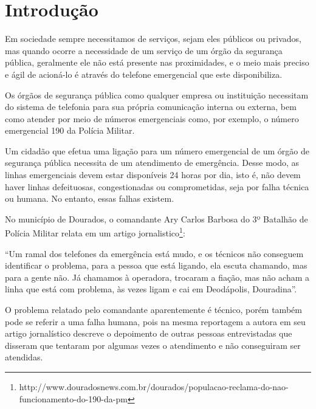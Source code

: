 
\chapter{Introdução}%
Em sociedade sempre necessitamos de serviços, sejam eles públicos ou privados, mas quando ocorre a necessidade de um serviço de um órgão da segurança pública, geralmente ele não está presente nas proximidades, e o meio mais preciso e ágil de acioná-lo é através do telefone emergencial que este disponibiliza.

Os órgãos de segurança pública como qualquer empresa ou instituição necessitam do sistema de telefonia para sua própria comunicação interna ou externa, bem como atender por meio de números emergenciais como, por exemplo, o número emergencial 190 da Polícia Militar.

Um cidadão que efetua uma ligação para um número emergencial de um órgão de segurança pública necessita de um atendimento de emergência. Desse modo, as linhas emergenciais devem estar disponíveis 24 horas por dia, isto é, não devem haver linhas defeituosas, congestionadas ou comprometidas, seja por falha técnica ou humana. No entanto, essas falhas existem.

No município de Dourados, o comandante Ary Carlos Barbosa do 3º Batalhão de Polícia Militar relata em um artigo jornalistico\footnote{http://www.douradosnews.com.br/dourados/populacao-reclama-do-nao-funcionamento-do-190-da-pm}:

\begin{citacao}
``Um ramal dos telefones da emergência está mudo, e os técnicos não conseguem identificar o problema, para a pessoa que está ligando, ela escuta chamando, mas para a gente não. Já chamamos à operadora, trocaram a fiação, mas não acham a linha que está com problema, às vezes ligam e cai em Deodápolis, Douradina''.
\end{citacao}

O problema relatado pelo comandante aparentemente é técnico, porém também pode se referir a uma falha humana, pois na mesma reportagem a autora  em seu artigo jornalístico descreve o depoimento de outras pessoas entrevistadas que disseram que tentaram por algumas vezes o atendimento e não conseguiram ser atendidas.

